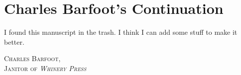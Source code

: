 \chapter{Charles Barfoot's Continuation}
I found this manuscript in the trash. I think I can add some stuff to make it better.
\begin{flushright}
\textsc{
Charles Barfoot,\\
Janitor of \emph{Whinery Press}}
\end{flushright}


